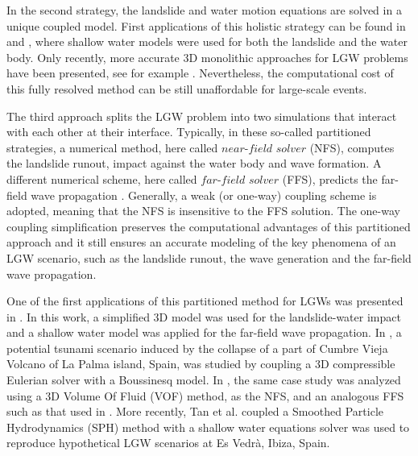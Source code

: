 In the second strategy, the landslide and water motion equations are solved in a unique coupled model. First applications of this holistic strategy can be found in \cite{kelfoun2010landslide} and \cite{giachetti2011numerical}, where shallow water models were used for both the landslide and the water body.
Only recently, more accurate 3D monolithic approaches for LGW problems have been presented, see for example
\cite{vacondio20133d, CrostaVajont, franci20203dA, franci20203dB, xu2021sph, terada2021}. Nevertheless, the computational cost of this fully resolved method can be still unaffordable for large-scale events.

The third approach splits the LGW problem into two simulations that interact with each other at their interface. Typically, in these so-called partitioned strategies, a numerical method, here called $near$-$field$ $solver$ (NFS), computes the landslide runout, impact against the water body and wave formation. A different numerical scheme, here called $far$-$field$ $solver$ (FFS), predicts the far-field wave propagation \cite{yavari2016numerical}.
Generally, a weak (or one-way) coupling scheme is adopted, meaning that the NFS is insensitive to the FFS solution. The one-way coupling simplification preserves the computational advantages of this partitioned approach and it still ensures an accurate modeling of the key phenomena of an LGW scenario, such as the landslide runout, the wave generation and the far-field wave propagation.
 
One of the first applications of this partitioned method for LGWs was presented in \cite{heinrich1998simulation}. In this work, a simplified 3D model was used for the landslide-water impact and a shallow water model was applied for the far-field wave propagation.
In \cite{lovholt2008oceanic}, a potential tsunami scenario induced by the collapse of a part of Cumbre Vieja Volcano of La Palma island, Spain, was studied by coupling a 3D compressible Eulerian solver with a Boussinesq model. In \cite{abadie2012numerical}, the same case study was analyzed using a 3D Volume Of Fluid (VOF) method, as the NFS, and an analogous FFS such as that used in \cite{lovholt2008oceanic}.
More recently, Tan et al. \cite{tan2018numerical} coupled a Smoothed Particle Hydrodynamics (SPH) method with a shallow water equations solver was used to reproduce hypothetical LGW scenarios at Es Vedrà, Ibiza, Spain.

